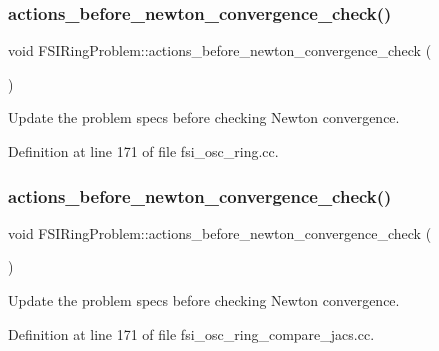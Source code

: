 \subsubsection{\texorpdfstring{actions\+\_\+before\+\_\+newton\+\_\+convergence\+\_\+check()}{actions\_before\_newton\_convergence\_check()}\hspace{0.1cm}{\footnotesize\ttfamily [1/2]}}
{\footnotesize\ttfamily void F\+S\+I\+Ring\+Problem\+::actions\+\_\+before\+\_\+newton\+\_\+convergence\+\_\+check (\begin{DoxyParamCaption}{ }\end{DoxyParamCaption})\hspace{0.3cm}{\ttfamily [inline]}}



Update the problem specs before checking Newton convergence. 



Definition at line 171 of file fsi\+\_\+osc\+\_\+ring.\+cc.

\mbox{\label{classFSIRingProblem_afaf315a9b0feb319cf66b21f959e465e}} 
\subsubsection{\texorpdfstring{actions\+\_\+before\+\_\+newton\+\_\+convergence\+\_\+check()}{actions\_before\_newton\_convergence\_check()}\hspace{0.1cm}{\footnotesize\ttfamily [2/2]}}
{\footnotesize\ttfamily void F\+S\+I\+Ring\+Problem\+::actions\+\_\+before\+\_\+newton\+\_\+convergence\+\_\+check (\begin{DoxyParamCaption}{ }\end{DoxyParamCaption})\hspace{0.3cm}{\ttfamily [inline]}}



Update the problem specs before checking Newton convergence. 



Definition at line 171 of file fsi\+\_\+osc\+\_\+ring\+\_\+compare\+\_\+jacs.\+cc.

\mbox{\label{classFSIRingProblem_a9fd26120e4e078bca685a5c94482ee12}} 
